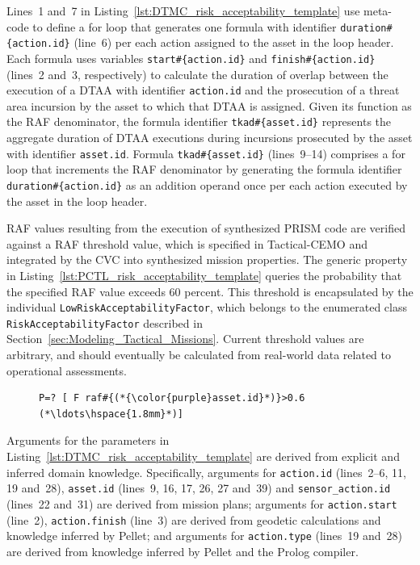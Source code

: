 Lines~1 and~7 in Listing~\ref{lst:DTMC_risk_acceptability_template} use meta-code to define a for loop that generates one formula with identifier \texttt{duration\#\{action.id\}} (line~6) per each action assigned to the asset in the loop header. Each formula uses variables \texttt{start\#\{action.id\}} and \texttt{finish\#\{action.id\}} (lines~2 and~3, respectively) to calculate the duration of overlap between the execution of a DTAA with identifier \texttt{action.id} and the prosecution of a threat area incursion by the asset to which that DTAA is assigned. Given its function as the RAF denominator, the formula identifier \texttt{tkad\#\{asset.id\}} represents the aggregate duration of DTAA executions during incursions prosecuted by the asset with identifier \texttt{asset.id}. Formula \texttt{tkad\#\{asset.id\}} (lines~9--14) comprises a for loop that increments the RAF denominator by generating the formula identifier \texttt{duration\#\{action.id\}} as an addition operand once per each action executed by the asset in the loop header.

RAF values resulting from the execution of synthesized PRISM code are verified against a RAF threshold value, which is specified in Tactical-CEMO and integrated by the CVC into synthesized mission properties. The generic property in Listing~\ref{lst:PCTL_risk_acceptability_template} queries the probability that the specified RAF value exceeds 60 percent. This threshold is encapsulated by the individual \texttt{LowRiskAcceptabilityFactor}, which belongs to the enumerated class \texttt{RiskAcceptabilityFactor} described in Section~\ref{sec:Modeling_Tactical_Missions}. Current threshold values are arbitrary, and should eventually be calculated from real-world data related to operational assessments.

\begin{figure}[ht]
\begin{lstlisting}[caption={PCTL template for risk acceptability},label=lst:PCTL_risk_acceptability_template]
P=? [ F raf#{(*{\color{purple}asset.id}*)}>0.6 (*\ldots\hspace{1.8mm}*)]
\end{lstlisting}
\end{figure}

Arguments for the parameters in Listing~\ref{lst:DTMC_risk_acceptability_template} are derived from explicit and inferred domain knowledge. Specifically, arguments for \texttt{action.id} (lines~2--6, 11, 19 and~28), \texttt{asset.id} (lines~9, 16, 17, 26, 27 and~39) and \texttt{sensor\_action.id} (lines~22 and~31) are derived from mission plans; arguments for \texttt{action.start} (line~2), \texttt{action.finish} (line~3) are derived from geodetic calculations and knowledge inferred by Pellet; and arguments for \texttt{action.type} (lines~19 and~28) are derived from knowledge inferred by Pellet and the Prolog compiler.

